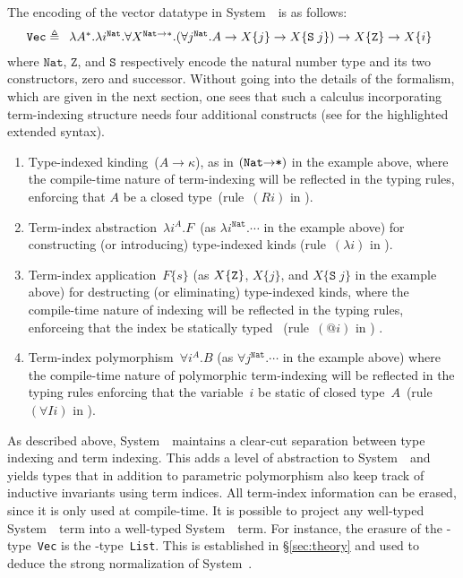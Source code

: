 The encoding of the vector datatype in System~\Fi\ is as follows:\vspace*{-5pt}
\begin{equation*}\label{FiVecType}
\texttt{{Vec}}
\triangleq
\begin{array}[t]{l}
\lambda A^{*}.\lambda
i^{\texttt{{Nat}}}.  \forall X^{\texttt{{Nat}}\to *}.
  (\forall j^{\texttt{{Nat}}}.A\to X\{j\}\to X\{\texttt{{S}}\; j\})
  \to X\{\texttt{{Z}}\}
    \to X\{i\}
\end{array}
\end{equation*}
where $\texttt{{Nat}}$, $\mathtt Z$, and $\mathtt S$ respectively encode
the natural number type and its two constructors,  zero and successor.
Without going into the details of the formalism, which are given in the
next section, one sees that such a calculus incorporating term-indexing
structure needs four additional constructs (see  for the
highlighted extended syntax).
\begin{enumerate}
\item 
  Type-indexed kinding~($A\to\kappa$), as in $(\texttt{{Nat}\ensuremath{\to}*})$
  in the example above, where the compile-time nature of term-indexing
  will be reflected in the typing rules, enforcing that $A$ be a closed
  type~(rule~$(Ri)$ in ).

\item 
  Term-index abstraction~$\lambda i^A.F$~(as $\lambda
  i^{\texttt{{Nat}}}.\cdots$ in the example above) for constructing (or
  introducing) type-indexed kinds (rule~$(\lambda i)$ in
  ).  

\item 
  Term-index application~$F\{s\}$ (as $X\{{\tt Z}\}$, $X\{j\}$, and
  $X\{\texttt{S}\;j\}$ in the example above) for destructing (or
  eliminating) type-indexed kinds, where the compile-time nature of
  indexing will be reflected in the typing rules, enforceing that the index be
  statically typed%
~(rule~$(@i)$ in ) .

\item 
  Term-index polymorphism~$\forall i^A.B$ (as $\forall
  j^{\texttt{{Nat}}}.\cdots$ in the example above) where the compile-time
  nature of polymorphic term-indexing will be reflected in the typing rules enforcing
  that the variable~$i$ be static of closed type~$A$~(rule~$(\forall
  Ii)$ in ).
\end{enumerate}

As described above, System~\Fi\ maintains a clear-cut separation between
type indexing and term indexing.  This adds a level of abstraction
to System~\Fw\ and yields types that in addition to parametric polymorphism
also keep track of inductive invariants using term indices. All term-index
information can be erased, since it is only used at compile-time.  
It is possible to project any well-typed System~\Fi\ term into a well-typed System~\Fw\ term.
For instance, the erasure of the \Fi-type~\texttt{Vec}
is the \Fw-type~\texttt{List}.  This is established in
\S\ref{sec:theory} and used to deduce the strong normalization of
System~\Fi.

